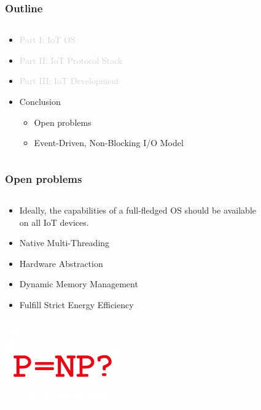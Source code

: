 \documentclass{beamer}
\begin{document}
\begin{frame}
	\frametitle{Outline}
	\begin{columns}[c]
		\begin{column}{30cm}
			\vspace{.1cm}
			\begin{itemize}
				\justifying
				\item \textcolor{LightGray}{Part I: IoT OS}
				\item \textcolor{LightGray}{Part II: IoT Protocol Stack}
				\item \textcolor{LightGray}{Part III: IoT Development}
				\item Conclusion
				\begin{itemize}
					\item Open problems
					\item Event-Driven, Non-Blocking I/O Model
				\end{itemize}				
			\end{itemize}
		\end{column}
	\end{columns}
\end{frame}

\begin{frame}
	\frametitle{Open problems}
	\begin{columns}[c]
		\begin{column}{30cm}
			\vspace{.1cm}
			\begin{itemize}
				\justifying
				\item Ideally, the capabilities of a full-fledged OS should be available\\
				on all IoT devices.
				\item Native Multi-Threading
				\item Hardware Abstraction
				\item Dynamic Memory Management
				\item Fulfill Strict Energy Efficiency
			\end{itemize}
		\end{column}
	\end{columns}
	\vspace{.5cm}
	\hspace*{5.5cm} \includegraphics[width=5cm]{figs/open-problems.jpg}
\end{frame}
\end{document}
